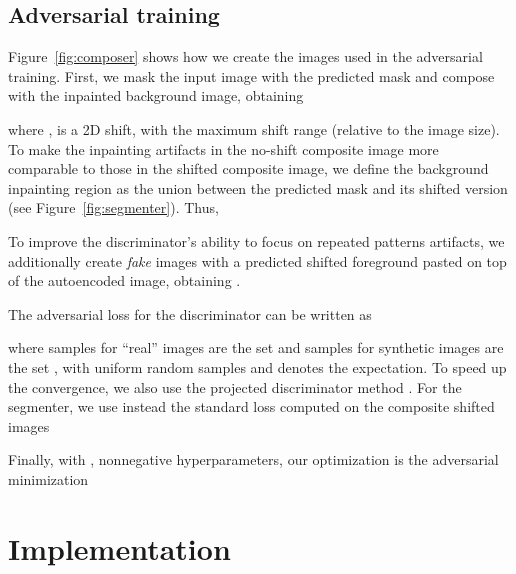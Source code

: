 \documentclass{article}
\begin{document}
\subsection{Adversarial training}

Figure~\ref{fig:composer} shows how we create the images used in the adversarial training. 
First, we mask the input image with the predicted mask and compose with the inpainted background image, obtaining

where ,  is a 2D shift, with  the maximum shift range (relative to the image size).
To make the inpainting artifacts in the no-shift composite image  more comparable to those in the shifted composite image, we define the background inpainting region as the union between the predicted mask and its shifted version (see Figure~\ref{fig:segmenter}). Thus,

To improve the discriminator's ability to focus on repeated patterns artifacts, we additionally create \emph{fake} images with a predicted shifted foreground pasted on top of the autoencoded image, obtaining .

The adversarial loss for the discriminator can be written as

where samples for ``real'' images  are the set  and samples for synthetic images  are the set , with uniform random samples  and  denotes the expectation.
To speed up the convergence, we also use the projected discriminator method  \cite{Sauer2021NEURIPS}.
For the segmenter, we use instead the standard loss computed on the composite shifted images


Finally, with ,
 nonnegative hyperparameters, our optimization is the adversarial minimization 








\section{Implementation}
\label{sec:implementation}
\end{document}
